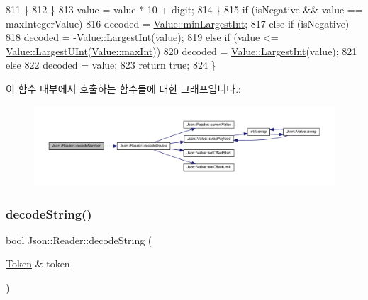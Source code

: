 \begin{DoxyCode}
811       \}
812     \}
813     value = value * 10 + digit;
814   \}
815   \textcolor{keywordflow}{if} (isNegative && value == maxIntegerValue)
816     decoded = \hyperlink{class_json_1_1_value_af91df130daa50dd43d2cd89e6ee67706}{Value::minLargestInt};
817   \textcolor{keywordflow}{else} \textcolor{keywordflow}{if} (isNegative)
818     decoded = -\hyperlink{class_json_1_1_value_a1cbb82642ed05109b9833e49f042ece7}{Value::LargestInt}(value);
819   \textcolor{keywordflow}{else} \textcolor{keywordflow}{if} (value <= \hyperlink{class_json_1_1_value_a6682a3684d635e03fc06ba229fa24eec}{Value::LargestUInt}(\hyperlink{class_json_1_1_value_a978c799a8af3114ef7dab6fd0a310a1b}{Value::maxInt}))
820     decoded = \hyperlink{class_json_1_1_value_a1cbb82642ed05109b9833e49f042ece7}{Value::LargestInt}(value);
821   \textcolor{keywordflow}{else}
822     decoded = value;
823   \textcolor{keywordflow}{return} \textcolor{keyword}{true};
824 \}
\end{DoxyCode}
이 함수 내부에서 호출하는 함수들에 대한 그래프입니다.\+:\nopagebreak
\begin{figure}[H]
\begin{center}
\leavevmode
\includegraphics[width=350pt]{class_json_1_1_reader_a72f426ce3fa384d14aa10e9dd75618f0_cgraph}
\end{center}
\end{figure}
\mbox{\label{class_json_1_1_reader_aaf736937912f5c9b8d221e57f209e3e0}} 
\subsubsection{\texorpdfstring{decode\+String()}{decodeString()}\hspace{0.1cm}{\footnotesize\ttfamily [1/2]}}
{\footnotesize\ttfamily bool Json\+::\+Reader\+::decode\+String (\begin{DoxyParamCaption}\item[{\hyperlink{class_json_1_1_reader_1_1_token}{Token} \&}]{token }\end{DoxyParamCaption})\hspace{0.3cm}{\ttfamily [private]}}



